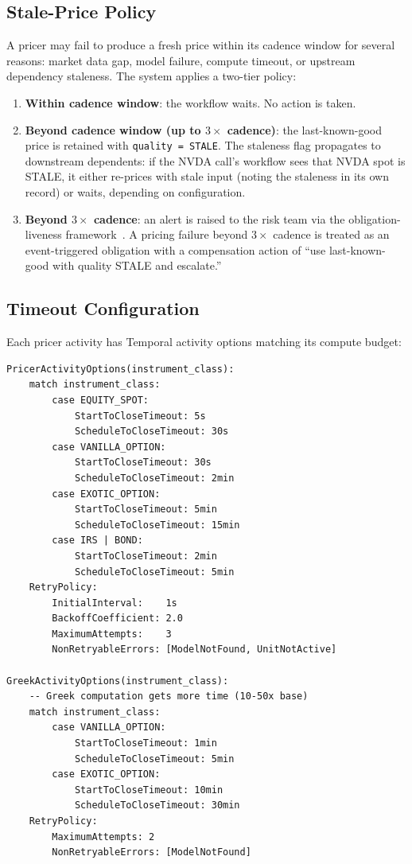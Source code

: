 \documentclass[11pt,a4paper]{article}
\begin{document}
\subsection{Stale-Price Policy}

A pricer may fail to produce a fresh price within its cadence window for several reasons: market data gap, model failure, compute timeout, or upstream dependency staleness.  The system applies a two-tier policy:

\begin{enumerate}
\item \textbf{Within cadence window}: the workflow waits.  No action is taken.
\item \textbf{Beyond cadence window (up to $3\times$ cadence)}: the last-known-good price is retained with \texttt{quality = STALE}.  The staleness flag propagates to downstream dependents: if the NVDA call's workflow sees that NVDA spot is STALE, it either re-prices with stale input (noting the staleness in its own record) or waits, depending on configuration.
\item \textbf{Beyond $3\times$ cadence}: an alert is raised to the risk team via the obligation-liveness framework~\cite[\S14.7]{ledger}.  A pricing failure beyond $3\times$ cadence is treated as an event-triggered obligation with a compensation action of ``use last-known-good with quality STALE and escalate.''
\end{enumerate}

\subsection{Timeout Configuration}

Each pricer activity has Temporal activity options matching its compute budget:

\begin{lstlisting}
PricerActivityOptions(instrument_class):
    match instrument_class:
        case EQUITY_SPOT:
            StartToCloseTimeout: 5s
            ScheduleToCloseTimeout: 30s
        case VANILLA_OPTION:
            StartToCloseTimeout: 30s
            ScheduleToCloseTimeout: 2min
        case EXOTIC_OPTION:
            StartToCloseTimeout: 5min
            ScheduleToCloseTimeout: 15min
        case IRS | BOND:
            StartToCloseTimeout: 2min
            ScheduleToCloseTimeout: 5min
    RetryPolicy:
        InitialInterval:    1s
        BackoffCoefficient: 2.0
        MaximumAttempts:    3
        NonRetryableErrors: [ModelNotFound, UnitNotActive]

GreekActivityOptions(instrument_class):
    -- Greek computation gets more time (10-50x base)
    match instrument_class:
        case VANILLA_OPTION:
            StartToCloseTimeout: 1min
            ScheduleToCloseTimeout: 5min
        case EXOTIC_OPTION:
            StartToCloseTimeout: 10min
            ScheduleToCloseTimeout: 30min
    RetryPolicy:
        MaximumAttempts: 2
        NonRetryableErrors: [ModelNotFound]
\end{lstlisting}
\end{document}
